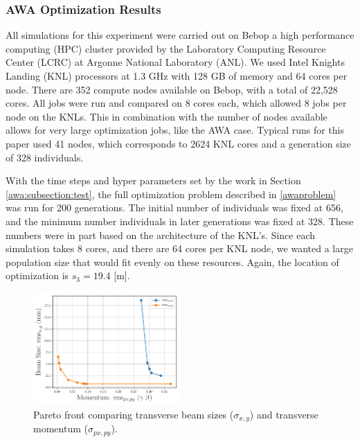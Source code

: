 \subsubsection{AWA Optimization Results}
All simulations for this experiment were carried out on Bebop a
high performance computing (HPC)
cluster provided by the Laboratory Computing Resource Center (LCRC)
at Argonne National Laboratory (ANL). We used Intel Knights Landing 
(KNL) processors at 1.3 GHz with 128 GB of memory 
and 64 cores per node. There are 352 compute nodes available on 
Bebop, with a total of 22,528 cores. All jobs were run and compared 
on 8 cores each, which allowed 8 jobs per node on the KNLs.
This in combination with the number of nodes available 
allows for very large optimization jobs, like the AWA case.
Typical runs for this paper used 41 nodes, which corresponds to 2624 KNL cores 
and a generation size of 328 individuals.


With the time steps and hyper parameters set by the work in Section \ref{awa:subsection:test}, 
the full optimization problem described in \ref{awaproblem} was run for 200 generations.
The initial number of individuals was fixed at 656, 
and the minimum number individuals in later generations was fixed at 328. 
These numbers were in part based on the architecture of the KNL's. 
Since each simulation takes 8 cores, and there are 64 cores per KNL node, 
we wanted a large population size that would fit evenly on these resources. 
Again, the location of optimization is $s_3=19.4$ [m]. 

\begin{figure}
	\includegraphics[width=0.5\textwidth]{../pareto_stat_plots/xy_vs_pxy_pareto_front_quads_before_Q5}
	\caption{Pareto front comparing transverse beam sizes ($\sigma_{x,y}$) and transverse momentum ($\sigma_{px,py}$).}
	\label{fig:pareto1}
\end{figure}

